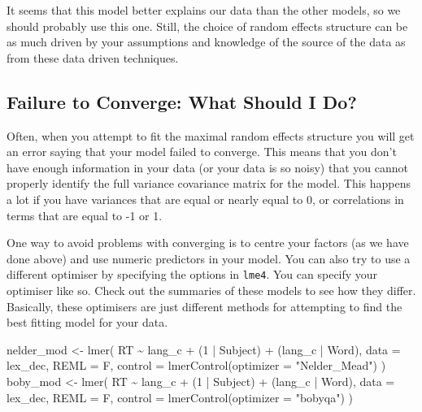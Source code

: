\documentclass[
]{book}
\newenvironment{Shaded}{\begin{snugshade}}{\end{snugshade}}
\newcommand{\AttributeTok}[1]{\textcolor[rgb]{0.77,0.63,0.00}{#1}}
\newcommand{\DecValTok}[1]{\textcolor[rgb]{0.00,0.00,0.81}{#1}}
\newcommand{\FunctionTok}[1]{\textcolor[rgb]{0.00,0.00,0.00}{#1}}
\newcommand{\NormalTok}[1]{#1}
\newcommand{\OtherTok}[1]{\textcolor[rgb]{0.56,0.35,0.01}{#1}}
\newcommand{\SpecialCharTok}[1]{\textcolor[rgb]{0.00,0.00,0.00}{#1}}
\newcommand{\StringTok}[1]{\textcolor[rgb]{0.31,0.60,0.02}{#1}}
\begin{document}
It seems that this model better explains our data than the other models, so we should probably use this one. Still, the choice of random effects structure can be as much driven by your assumptions and knowledge of the source of the data as from these data driven techniques.

\hypertarget{failure-to-converge-what-should-i-do}{%
\subsection{Failure to Converge: What Should I Do?}\label{failure-to-converge-what-should-i-do}}

Often, when you attempt to fit the maximal random effects structure you will get an error saying that your model failed to converge. This means that you don't have enough information in your data (or your data is so noisy) that you cannot properly identify the full variance covariance matrix for the model. This happens a lot if you have variances that are equal or nearly equal to 0, or correlations in terms that are equal to -1 or 1.

One way to avoid problems with converging is to centre your factors (as we have done above) and use numeric predictors in your model. You can also try to use a different optimiser by specifying the options in \texttt{lme4}. You can specify your optimiser like so. Check out the summaries of these models to see how they differ. Basically, these optimisers are just different methods for attempting to find the best fitting model for your data.

\begin{Shaded}
\begin{Highlighting}[]
\NormalTok{nelder\_mod }\OtherTok{\textless{}{-}} \FunctionTok{lmer}\NormalTok{(}
\NormalTok{  RT }\SpecialCharTok{\textasciitilde{}}\NormalTok{ lang\_c }\SpecialCharTok{+}\NormalTok{ (}\DecValTok{1} \SpecialCharTok{|}\NormalTok{ Subject) }\SpecialCharTok{+}\NormalTok{ (lang\_c }\SpecialCharTok{|}\NormalTok{ Word), }
  \AttributeTok{data =}\NormalTok{ lex\_dec, }\AttributeTok{REML =}\NormalTok{ F, }
  \AttributeTok{control =} \FunctionTok{lmerControl}\NormalTok{(}\AttributeTok{optimizer =} \StringTok{"Nelder\_Mead"}\NormalTok{)}
\NormalTok{  )}
\NormalTok{boby\_mod }\OtherTok{\textless{}{-}} \FunctionTok{lmer}\NormalTok{(}
\NormalTok{  RT }\SpecialCharTok{\textasciitilde{}}\NormalTok{ lang\_c }\SpecialCharTok{+}\NormalTok{ (}\DecValTok{1} \SpecialCharTok{|}\NormalTok{ Subject) }\SpecialCharTok{+}\NormalTok{ (lang\_c }\SpecialCharTok{|}\NormalTok{ Word), }
  \AttributeTok{data =}\NormalTok{ lex\_dec, }\AttributeTok{REML =}\NormalTok{ F, }
  \AttributeTok{control =} \FunctionTok{lmerControl}\NormalTok{(}\AttributeTok{optimizer =} \StringTok{"bobyqa"}\NormalTok{)}
\NormalTok{     )}
\end{Highlighting}
\end{Shaded}
\end{document}
